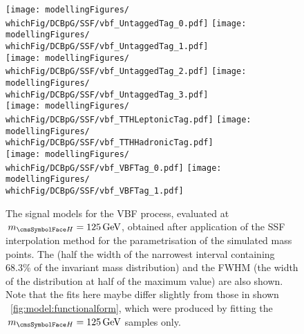 \begin{figure}[htp!]
\centering
\texttt{[image: modellingFigures/\\whichFig/DCBpG/SSF/vbf\_UntaggedTag\_0.pdf]} 
\texttt{[image: modellingFigures/\\whichFig/DCBpG/SSF/vbf\_UntaggedTag\_1.pdf]} \\
\texttt{[image: modellingFigures/\\whichFig/DCBpG/SSF/vbf\_UntaggedTag\_2.pdf]} 
\texttt{[image: modellingFigures/\\whichFig/DCBpG/SSF/vbf\_UntaggedTag\_3.pdf]} \\ 
\texttt{[image: modellingFigures/\\whichFig/DCBpG/SSF/vbf\_TTHLeptonicTag.pdf]} 
\texttt{[image: modellingFigures/\\whichFig/DCBpG/SSF/vbf\_TTHHadronicTag.pdf]} \\ 
\texttt{[image: modellingFigures/\\whichFig/DCBpG/SSF/vbf\_VBFTag\_0.pdf]} 
\texttt{[image: modellingFigures/\\whichFig/DCBpG/SSF/vbf\_VBFTag\_1.pdf]} \\

\caption{The signal models for the VBF process, evaluated at $\mH=125\GeV$, obtained after application of the SSF interpolation method for the \DCBpG parametrisation of the simulated mass points. The \effSigma (half the width of the narrowest interval containing 68.3\% of the invariant mass distribution) and the FWHM (the width of the distribution at half of the maximum value) are also shown. Note that the fits here maybe differ slightly from those in shown \Fig~\ref{fig:model:functionalform}, which were produced by fitting the $\mH=125\GeV$ samples only.}

\label{fig:model:sig_model_per_vbf}
\end{figure}

